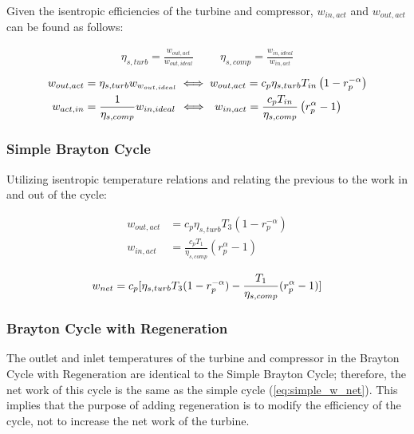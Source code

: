 \documentclass[
	12pt, %
]{brayton_cycle_report_style}
\begin{document}
Given the isentropic efficiencies of the turbine and compressor, $w_{in,act}$ and $w_{out,act}$ can be found as follows:

\begin{align*}
    \eta_{s,turb} = \frac{w_{out,act}}{w_{out,ideal}} \hspace{1cm} 
    \eta_{s,comp} = \frac{w_{in,ideal}}{w_{in,act}} 
\end{align*}
\vspace{2mm}
\begin{align*}
    w_{out,act} &= \eta_{s,turb}w_{w_{out,ideal}} \iff w_{out,act} = c_{p}\eta_{s,turb}T_{in}\left(1-r_{p}^{-\alpha}\right) \\
    w_{act,in} &= \frac{1}{\eta_{s,comp}}{w_{in,ideal}} \, \iff \hspace{0.145cm} w_{in,act} = \frac{c_{p}T_{in}}{\eta_{s,comp}}\left(r_{p}^{\alpha} - 1\right)
\end{align*}
\vspace{2mm}

\subsubsection{Simple Brayton Cycle} 
\noindent Utilizing isentropic temperature relations and relating the previous to the work in and out of the cycle:

\vspace{-5mm}


\begin{align*}
    w_{out,act} &= c_{p}\eta_{s,turb}T_{3}\left(1-r_{p}^{-\alpha}\right) \\
    w_{in,act} &= \frac{c_{p}T_{1}}{\eta_{s,comp}}\left(r_{p}^{\alpha} - 1\right)
\end{align*}

\vspace{1.5mm}

\begin{equation}
    w_{net} = c_p[\eta_{s,turb}T_3(1-r_p^{-\alpha})-\frac{T_1}{\eta_{s,comp}}(r_p^\alpha-1)] \\
    \label{eq:simple_w_net}
\end{equation}

\subsubsection{Brayton Cycle with Regeneration} 
The outlet and inlet temperatures of the turbine and compressor in the Brayton Cycle with Regeneration are identical to the Simple Brayton Cycle; therefore, the net work of this cycle is the same as the simple cycle (\ref{eq:simple_w_net}). This implies that the purpose of adding regeneration is to modify the efficiency of the cycle, not to increase the net work of the turbine.
\end{document}
